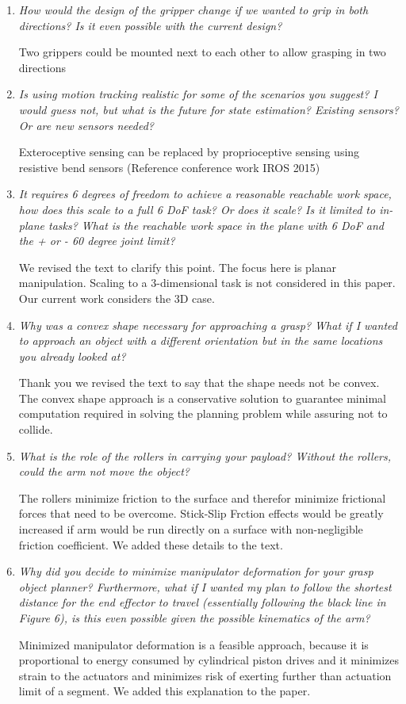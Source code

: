 \documentclass[letterpaper, 10 pt, twocolumn, conference]{article}
\begin{document}
\begin{enumerate}
\item \textit{How would the design of the gripper change if we wanted to grip in both directions? Is it even possible with the current design?}

Two grippers could be mounted next to each other to allow grasping in two directions

\item \textit{Is using motion tracking realistic for some of the scenarios you suggest? I would guess not, but what is the future for state estimation? Existing sensors? Or are new sensors needed?}

Exteroceptive sensing can be replaced by proprioceptive sensing using resistive bend sensors (Reference conference work IROS 2015)

\item \textit{It requires 6 degrees of freedom to achieve a reasonable reachable work space, how does this scale to a full 6 DoF task? Or does it scale? Is it limited to in-plane tasks? What is the reachable work space in the plane with 6 DoF and the + or - 60 degree joint limit?}

We revised the text to clarify this point. The focus here is planar manipulation. Scaling to a 3-dimensional task is not considered in this paper. Our current work considers the 3D case. 

\item \textit{Why was a convex shape necessary for approaching a grasp? What if I wanted to approach an object with a different orientation but in the same locations you already looked at?}

Thank you we revised the text to say that the shape needs not be convex. The convex shape approach is a conservative solution to guarantee minimal computation required in solving the planning problem while assuring not to collide. 

\item \textit{What is the role of the rollers in carrying your payload? Without the rollers, could the arm not move the object?}

The rollers minimize friction to the surface and therefor minimize frictional forces that need to be overcome. Stick-Slip Frction effects would be greatly increased if arm would be run directly on a surface with non-negligible friction coefficient. We added these details to the text.

\item \textit{Why did you decide to minimize manipulator deformation for your grasp object planner? Furthermore, what if I wanted my plan to follow the shortest distance for the end effector to travel (essentially following the black line in Figure 6), is this even possible given the possible kinematics of the arm?}

Minimized manipulator deformation is a feasible approach, because it is proportional to energy consumed by cylindrical piston drives and it minimizes strain to the actuators and minimizes risk of exerting further than actuation limit of a segment. We added this explanation to the paper. 

\end{enumerate}
\end{document}
